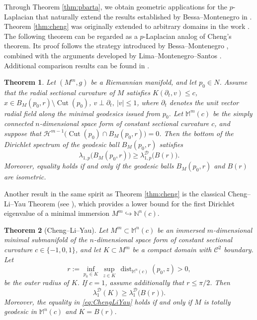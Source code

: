 \documentclass{article}
\newtheorem{theorem}{Theorem}[section]
\begin{document}
Through Theorem \ref{thm:pbarta}, we obtain geometric applications for the $p$-Laplacian that naturally extend the results established by Bessa--Montenegro in \cite[Section 2]{BessaMontenegro}. Theorem \ref{thm:cheng} was originally extended to arbitrary domains in the work \cite{BessaMontenegro}. The following theorem can be regarded as a $p$-Laplacian analog of Cheng's theorem. Its proof follows the strategy introduced by Bessa--Montenegro \cite[Theorem 1.8]{BessaMontenegro}, combined with the arguments developed by Lima--Montenegro--Santos \cite{LimaMontenegroSantos2010}. Additional comparison results can be found in \cite{BarrosoBessa2006, BessaMontenegro2003, matei, Mao2014}.

\begin{theorem}\label{thm:Cheng}
    Let $(M^m,g)$ be a Riemannian manifold, and let $p_0\in N$. Assume that the radial sectional curvature of $M$ satisfies $K(\partial_t,v) \leq c$, $x\in B_M(p_0,r)\setminus \operatorname{Cut}(p_0)$, $v\perp \partial_t,\ |v|\leq1$, where $\partial_t$ denotes the unit vector radial field along the minimal geodesics issued from $p_0$. Let $\mathbb M^m(c)$ be the simply connected $n$-dimensional space form of constant sectional curvature $c$, and suppose that $\mathcal{H}^{m-1}\big(\operatorname{Cut}(p_0)\cap B_M(p_0,r)\big)=0$. Then the bottom of the Dirichlet spectrum of the geodesic ball $B_M(p_0,r)$ satisfies
\begin{equation}
\lambda_{1,p}\big(B_M(p_0,r)\big) \geq \lambda_{1,p}^{\mathcal{D}}\big(B(r)\big).    
\end{equation}\label{comparison}
Moreover, equality holds if and only if the geodesic balls
$B_M(p_0,r)$ and $B(r)$ are isometric.
\end{theorem}

Another result in the same spirit as Theorem \ref{thm:cheng} is the classical
Cheng--Li--Yau Theorem (see \cite{ChengLiYau1984}), which provides a lower bound
for the first Dirichlet eigenvalue of a minimal immersion $M^{m} \hookrightarrow \mathbb{N}^{n}(c)$.

\begin{theorem}[Cheng--Li--Yau]\label{thm:ChengLiY}
Let $M^{m}\subset \mathbb{M}^{n}(c)$ be an immersed $m$-dimensional minimal submanifold
of the $n$-dimensional space form of constant sectional curvature
$c\in\{-1,0,1\}$, and let $K\subset M^{m}$ be a compact domain with $\mathcal{C}^{2}$ boundary.
Let
\[
r:=\inf_{p_0\in K}\,\sup_{z\in K}\,
\operatorname{dist}_{\mathbb{M}^{n}(c)}(p_0,z)>0,
\]
be the outer radius of $K$.
If $c=1$, assume additionally that $r \leq \pi/2$.
Then
\begin{equation}\label{eq:ChengLiYau}
    \lambda_{1}^{\mathcal{D}}(K)\ge \lambda_{1}^{\mathcal{D}}\big(B(r)\big).
\end{equation}
Moreover, the equality in \eqref{eq:ChengLiYau} holds if and only if
$M$ is totally geodesic in $\mathbb{M}^{n}(c)$ and
$K=B(r)$.
\end{theorem}
\end{document}
